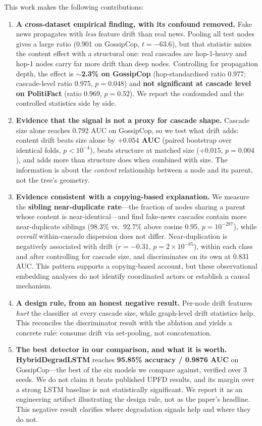 \documentclass[10pt,twocolumn]{article}
\begin{document}
This work makes the following contributions:
\begin{enumerate}[leftmargin=*,itemsep=2pt]
\item \textbf{A cross-dataset empirical finding, with its confound removed.}
Fake news propagates with \emph{less} feature drift than real news. Pooling all
test nodes gives a large ratio (0.901 on GossipCop, $t=-63.6$), but that
statistic mixes the content effect with a structural one: real cascades are
hop-1-heavy and hop-1 nodes carry far more drift than deep nodes. Controlling
for propagation depth, the effect is \textbf{$\sim$2.3\% on GossipCop}
(hop-standardised ratio 0.977; cascade-level ratio 0.975, $p=0.048$) and
\textbf{not significant at cascade level on PolitiFact} (ratio 0.969,
$p=0.52$). We report the confounded and the controlled statistics side by side.
\item \textbf{Evidence that the signal is not a proxy for cascade shape.}
Cascade size alone reaches 0.792 AUC on GossipCop, so we test what drift adds:
content drift beats size alone by \textbf{$+0.054$ AUC} (paired bootstrap over
identical folds, $p<10^{-4}$), beats structure at matched size ($+0.015$,
$p=0.004$), and adds more than structure does when combined with size. The
information is about the \emph{content} relationship between a node and its
parent, not the tree's geometry.
\item \textbf{Evidence consistent with a copying-based explanation.} We measure
the \textbf{sibling near-duplicate rate}---the fraction of nodes sharing a
parent whose content is near-identical---and find fake-news cascades contain
more near-duplicate siblings (98.3\% vs.\ 92.7\% above cosine 0.95,
$p=10^{-287}$), while \emph{overall} within-cascade dispersion does not differ.
Near-duplication is negatively associated with drift ($r=-0.31$,
$p=2\times10^{-85}$), within each class and after controlling for cascade
size, and discriminates on its own at 0.831 AUC. This pattern supports a
copying-based account, but these observational embedding analyses do not
identify coordinated actors or establish a causal mechanism.
\item \textbf{A design rule, from an honest negative result.} Per-node drift
features \emph{hurt} the classifier at every cascade size, while graph-level
drift statistics help. This reconciles the discriminator result with the
ablation and yields a concrete rule: consume drift via set-pooling, not
concatenation.
\item \textbf{The best detector in our comparison, and what it is worth.}
\textbf{HybridDegradLSTM} reaches \textbf{95.85\% accuracy / 0.9876 AUC} on
GossipCop---the best of the six models we compare against, verified over 3
seeds. We do not claim it beats published UPFD results, and its margin over a
strong LSTM baseline is not statistically significant. We report it as an
engineering artifact illustrating the design rule, not as the paper's
headline. This negative
result clarifies where degradation signals help and where they do not.
\end{enumerate}
\end{document}
